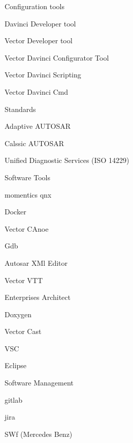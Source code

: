 


\begin{cvskills}
  \cvskill
    {\normalsize Configuration tools}  %
        {
            \item {Davinci Developer tool}
            \item {Vector Developer tool}
            \item {Vector Davinci Configurator Tool}
            \item {Vector Davinci Scripting}
            \item {Vector Davinci Cmd}
        }
  \cvskill
    {\normalsize Standards} %
        {
            \item Adaptive AUTOSAR
            \item Calssic AUTOSAR
            \item Unified Diagnostic Services (ISO 14229)
        }
  \cvskill
    {\normalsize Software Tools} %
        {
            \item momentics qnx
            \item Docker
            \item Vector CAnoe
            \item Gdb
            \item Autosar XMl Editor
            \item Vector VTT
            \item Enterprises Architect
            \item Doxygen
            \item Vector Cast
            \item VSC
            \item Eclipse
        }
  \cvskill
    {\normalsize Software Management} %
        {
            \item gitlab
            \item jira
            \item SWf (Mercedes Benz)
}
\end{cvskills}
